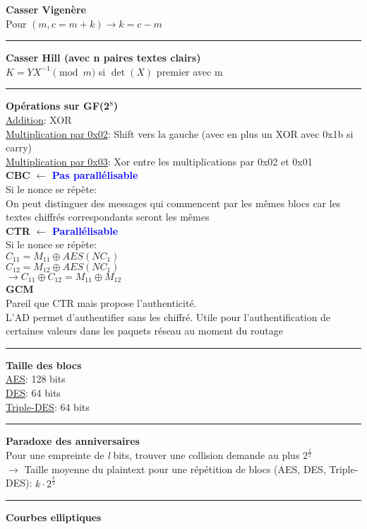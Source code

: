 \documentclass{article}
\begin{document}
\begin{multicols*}{2}
\textbf{Casser Vigenère}\\
Pour $(m, c = m+k) \rightarrow k = c-m$\\
\noindent\rule{7cm}{0.5pt}
\textbf{Casser Hill (avec n paires textes clairs)}\\
$ K = YX^{-1} \pmod m$ si $\det(X)$ premier avec m\\
\noindent\rule{7cm}{0.5pt}
\textbf{Opérations sur GF(2$^8$)}\\
\uline{Addition}: XOR\\
\uline{Multiplication par 0x02}: Shift vers la gauche (avec en plus un XOR avec 0x1b si carry)\\
\uline{Multiplication par 0x03}: Xor entre les multiplications par 0x02 et 0x01 \\
\textbf{CBC} $\leftarrow$ \textbf{\textcolor{blue}{Pas parallélisable}}\\
Si le nonce se répète:\\
On peut distinguer des messages qui commencent par les mêmes
blocs car les textes chiffrés correspondants seront les mêmes\\
\textbf{CTR} $\leftarrow$ \textbf{\textcolor{blue}{Parallélisable}}\\
Si le nonce se répète: \\
$C_{11} = M_{11} \oplus AES(NC_{1})$\\
$C_{12} = M_{12} \oplus AES(NC_{1})$\\
$\rightarrow C_{11} \oplus C_{12} = M_{11} \oplus M_{12}$ \\
\textbf{GCM}\\
Pareil que CTR mais propose l'authenticité.\\
L'AD permet d'authentifier sans les chiffré. Utile pour l'authentification de certaines valeurs dans les paquets réseau au moment du routage
\noindent\rule{7cm}{0.5pt}
\textbf{Taille des blocs}\\
\uline{AES}: 128 bits\\
\uline{DES}: 64 bits\\
\uline{Triple-DES}: 64 bits\\
\noindent\rule{7cm}{0.5pt}
\textbf{Paradoxe des anniversaires}\\
Pour une empreinte de \textit{l} bits, trouver une collision demande au plus $2^{\frac{l}{2}}$\\
$\rightarrow$ Taille moyenne du plaintext pour une répétition de blocs (AES, DES, Triple-DES): $k \cdot 2^{\frac{k}{2}}$\\
\noindent\rule{7cm}{0.5pt}
\textbf{Courbes elliptiques}\\

\end{multicols*}
\end{document}
